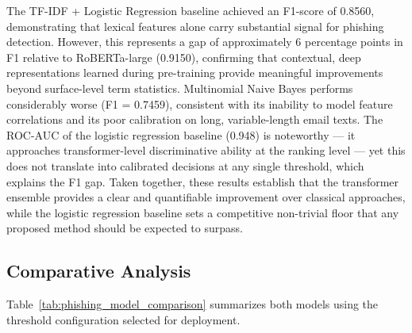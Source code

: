 The TF-IDF + Logistic Regression baseline achieved an F1-score of 0.8560, demonstrating that lexical features alone carry substantial signal for phishing detection. However, this represents a gap of approximately 6 percentage points in F1 relative to \acs{RoBERTa}-large (0.9150), confirming that contextual, deep representations learned during pre-training provide meaningful improvements beyond surface-level term statistics. Multinomial Naive Bayes performs considerably worse (F1 = 0.7459), consistent with its inability to model feature correlations and its poor calibration on long, variable-length email texts. The ROC-AUC of the logistic regression baseline (0.948) is noteworthy --- it approaches transformer-level discriminative ability at the ranking level --- yet this does not translate into calibrated decisions at any single threshold, which explains the F1 gap. Taken together, these results establish that the transformer ensemble provides a clear and quantifiable improvement over classical approaches, while the logistic regression baseline sets a competitive non-trivial floor that any proposed method should be expected to surpass.

\subsection{Comparative Analysis}
\label{sec:evaluation}
Table~\ref{tab:phishing_model_comparison} summarizes both models using the threshold configuration selected for deployment.

\begin{table}[htbp]
\centering
\caption{Cross-model comparison on the test set (selected threshold per model).}
\label{tab:phishing_model_comparison}
\end{table}

